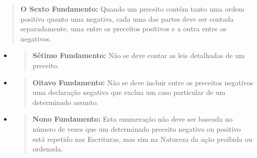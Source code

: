 \begin{quote}
\textbf{O Sexto Fundamento:} Quando um preceito contém tanto uma ordem
positiva quanto uma negativa, cada uma das partes deve ser contada
separadamente, uma entre os preceitos positivos e a outra entre os
negativos.
\end{quote}

\begin{itemize}
\item
 \begin{quote}
 \textbf{Sétimo Fundamento:} Não se deve contar as leis detalhadas de
 um preceito.
 \end{quote}
\item
 \begin{quote}
 \textbf{Oitavo Fundamento:} Não se deve incluir entre os preceitos
 negativos uma declaração negativa que exclua um caso particular de um
 determinado assunto.
 \end{quote}
\item
 \begin{quote}
 \textbf{Nono Fundamento:} Esta enumeração não deve ser baseada no
 número de vezes que um determinado preceito negativo ou positivo está
 repetido nas Es­crituras, mas sim na Natureza da ação proibida ou
 ordenada.
 \end{quote}
\end{itemize}

